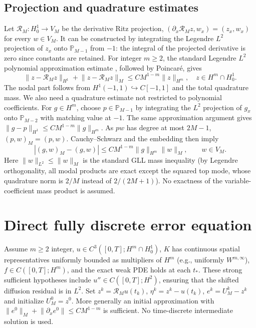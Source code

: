 \documentclass[11pt,a4paper]{article}
\newcommand{\norm}[1]{\lVert#1\rVert}
\begin{document}
\subsection*{Projection and quadrature estimates}
Let $\mathcal R_M:H_0^1\to V_M$ be the derivative Ritz projection, $(\partial_x\mathcal R_M z,w_x)=(z_x,w_x)$ for every $w\in V_M$. It can be constructed by integrating the Legendre $L^2$ projection of $z_x$ onto $\mathbb P_{M-1}$ from $-1$: the integral of the projected derivative is zero since constants are retained. For integer $m\ge2$, the standard Legendre $L^2$ polynomial approximation estimate \cite{cq}, followed by Poincar\'e, gives
\begin{equation}\label{eq:proj}
 \norm{z-\mathcal R_M z}_{H^1}+\norm{z-\mathcal R_M z}_M\le C M^{1-m}\norm{z}_{H^m},\quad z\in H^m\cap H_0^1.
\end{equation}
The nodal part follows from $H^1(-1,1)\hookrightarrow C[-1,1]$ and the total quadrature mass. We also need a quadrature estimate not restricted to polynomial coefficients. For $g\in H^m$, choose $p\in\mathbb P_{M-1}$ by integrating the $L^2$ projection of $g_x$ onto $\mathbb P_{M-2}$ with matching value at $-1$. The same approximation argument gives $\norm{g-p}_{H^1}\le C M^{1-m}\norm{g}_{H^m}$. As $pw$ has degree at most $2M-1$, $(p,w)_M=(p,w)$. Cauchy--Schwarz and the embedding then imply
\begin{equation}\label{eq:quad}
 |(g,w)_M-(g,w)|\le C M^{1-m}\norm{g}_{H^m}\norm{w}_M,\qquad w\in V_M.
\end{equation}
Here $\norm{w}_{L^2}\le\norm{w}_M$ is the standard GLL mass inequality (by Legendre orthogonality, all modal products are exact except the squared top mode, whose quadrature norm is $2/M$ instead of $2/(2M+1)$). No exactness of the variable-coefficient mass product is assumed.
\section{Direct fully discrete error equation}
Assume $m\ge2$ integer, $u\in C^3([0,T];H^m\cap H_0^1)$, $K$ has continuous spatial representatives uniformly bounded as multipliers of $H^m$ (e.g., uniformly $W^{m,\infty}$), $f\in C([0,T];H^m)$, and the exact weak PDE holds at each $t_*$. These strong sufficient hypotheses include $u''\in C([0,T];H^2)$, ensuring that the shifted diffusion residual is in $L^2$. Set $z^k=\mathcal R_M u(t_k)$, $\eta^k=z^k-u(t_k)$, $e^k=U_M^k-z^k$ and initialize $U_M^0=z^0$. More generally an initial approximation with $\norm{e^0}_M+\norm{\partial_xe^0}\le C M^{1-m}$ is sufficient. No time-discrete intermediate solution is used.
\end{document}
